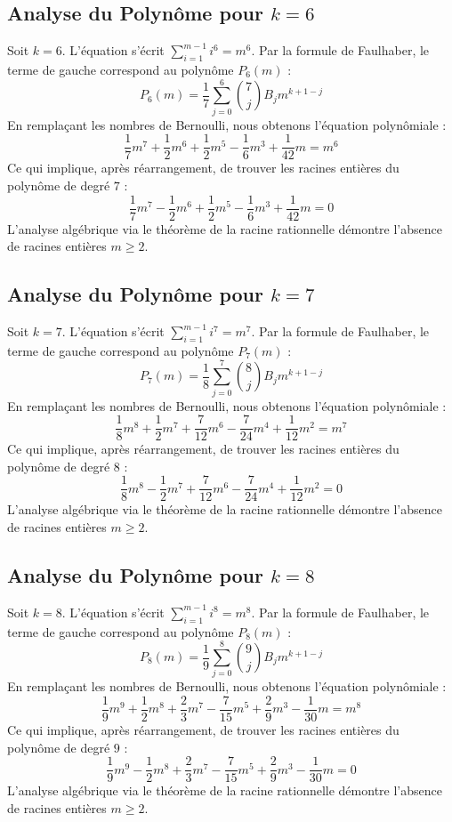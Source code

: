 \documentclass[11pt,a4paper]{article}
\begin{document}
\subsection{Analyse du Polynôme pour $k = 6$}
Soit $k = 6$. L'équation s'écrit $\sum_{i=1}^{m-1} i^{6} = m^{6}$.
Par la formule de Faulhaber, le terme de gauche correspond au polynôme $P_{6}(m)$ :
$$ P_{6}(m) = \frac{1}{7} \sum_{j=0}^{6} \binom{7}{j} B_j m^{k+1-j} $$
En remplaçant les nombres de Bernoulli, nous obtenons l'équation polynômiale :
$$ \frac{1}{7} m^7+\frac{1}{2} m^6+\frac{1}{2} m^5-\frac{1}{6} m^3+\frac{1}{42} m = m^{6} $$
Ce qui implique, après réarrangement, de trouver les racines entières du polynôme de degré $7$ :
$$ \frac{1}{7} m^7-\frac{1}{2} m^6+\frac{1}{2} m^5-\frac{1}{6} m^3+\frac{1}{42} m = 0 $$
L'analyse algébrique via le théorème de la racine rationnelle démontre l'absence de racines entières $m \geq 2$.

\subsection{Analyse du Polynôme pour $k = 7$}
Soit $k = 7$. L'équation s'écrit $\sum_{i=1}^{m-1} i^{7} = m^{7}$.
Par la formule de Faulhaber, le terme de gauche correspond au polynôme $P_{7}(m)$ :
$$ P_{7}(m) = \frac{1}{8} \sum_{j=0}^{7} \binom{8}{j} B_j m^{k+1-j} $$
En remplaçant les nombres de Bernoulli, nous obtenons l'équation polynômiale :
$$ \frac{1}{8} m^8+\frac{1}{2} m^7+\frac{7}{12} m^6-\frac{7}{24} m^4+\frac{1}{12} m^2 = m^{7} $$
Ce qui implique, après réarrangement, de trouver les racines entières du polynôme de degré $8$ :
$$ \frac{1}{8} m^8-\frac{1}{2} m^7+\frac{7}{12} m^6-\frac{7}{24} m^4+\frac{1}{12} m^2 = 0 $$
L'analyse algébrique via le théorème de la racine rationnelle démontre l'absence de racines entières $m \geq 2$.

\subsection{Analyse du Polynôme pour $k = 8$}
Soit $k = 8$. L'équation s'écrit $\sum_{i=1}^{m-1} i^{8} = m^{8}$.
Par la formule de Faulhaber, le terme de gauche correspond au polynôme $P_{8}(m)$ :
$$ P_{8}(m) = \frac{1}{9} \sum_{j=0}^{8} \binom{9}{j} B_j m^{k+1-j} $$
En remplaçant les nombres de Bernoulli, nous obtenons l'équation polynômiale :
$$ \frac{1}{9} m^9+\frac{1}{2} m^8+\frac{2}{3} m^7-\frac{7}{15} m^5+\frac{2}{9} m^3-\frac{1}{30} m = m^{8} $$
Ce qui implique, après réarrangement, de trouver les racines entières du polynôme de degré $9$ :
$$ \frac{1}{9} m^9-\frac{1}{2} m^8+\frac{2}{3} m^7-\frac{7}{15} m^5+\frac{2}{9} m^3-\frac{1}{30} m = 0 $$
L'analyse algébrique via le théorème de la racine rationnelle démontre l'absence de racines entières $m \geq 2$.
\end{document}
